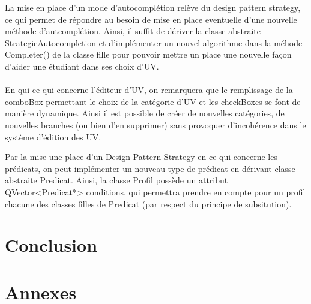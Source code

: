 \documentclass[a4paper,10pt,french]{report}
\begin{document}
	La mise en place d'un mode d'autocomplétion relève du design pattern strategy, ce qui permet de répondre au besoin de mise en place eventuelle d'une nouvelle méthode d'autcomplétion.
	Ainsi, il suffit de dériver la classe abstraite StrategieAutocompletion et d'implémenter un nouvel algorithme dans la méhode Completer() de la classe fille pour pouvoir mettre un place une nouvelle façon d'aider une étudiant dans ses choix d'UV.\\\\
	
	En qui ce qui concerne l'éditeur d'UV, on remarquera que le remplissage de la comboBox permettant le choix de la catégorie d'UV et les checkBoxes se font de manière dynamique. Ainsi il est possible de créer de nouvelles catégories, de nouvelles branches (ou bien d'en supprimer) sans provoquer d'incohérence dans le système d'édition des UV.
	
    Par la mise une place d'un Design Pattern Strategy en ce qui concerne les prédicats, on peut implémenter un nouveau type de prédicat en dérivant classe abstraite Predicat.
    Ainsi, la classe Profil possède un attribut QVector<Predicat*> conditions, qui permettra prendre en compte pour un profil chacune des classes filles de Predicat (par respect du principe de subsitution).
    
	
	
	
	
	
\newpage			
\section*{Conclusion}\label{sec:Conclusion}








%
%

\appendix
\section*{Annexes}\label{sec:Annexes}
\end{document}
